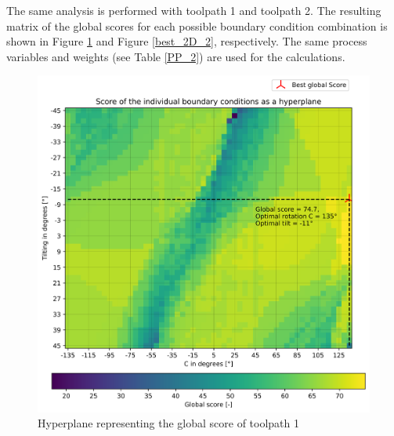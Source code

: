 The same analysis is performed with toolpath 1 and toolpath 2. The resulting matrix of the global scores for each possible boundary condition combination is shown in Figure \ref{best_2D_1} and Figure \ref{best_2D_2}, respectively. The same process variables and weights (see Table \ref{PP_2}) are used for the calculations.
\newpage
\begin{figure}[H]
	\centerline{\includegraphics[width=1\textwidth]{figures/best_2D_1.png}}
	\caption{Hyperplane representing the global score of toolpath 1}
	\label{best_2D_1}
\end{figure}

